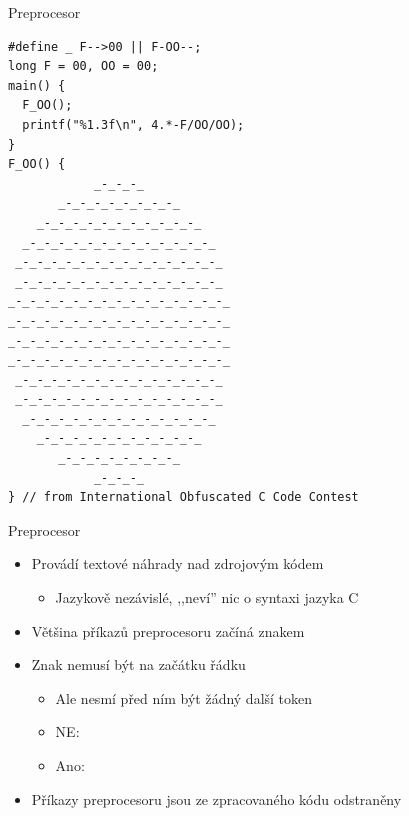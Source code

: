 \begin{frame}[fragile]{Preprocesor}

\begin{lstlisting}[columns=fixed,basicstyle=\scriptsize\ttfamily]
#define _ F-->00 || F-OO--;
long F = 00, OO = 00;
main() {
  F_OO();
  printf("%1.3f\n", 4.*-F/OO/OO);
}
F_OO() {
            _-_-_-_
       _-_-_-_-_-_-_-_-_
    _-_-_-_-_-_-_-_-_-_-_-_
  _-_-_-_-_-_-_-_-_-_-_-_-_-_
 _-_-_-_-_-_-_-_-_-_-_-_-_-_-_
 _-_-_-_-_-_-_-_-_-_-_-_-_-_-_
_-_-_-_-_-_-_-_-_-_-_-_-_-_-_-_
_-_-_-_-_-_-_-_-_-_-_-_-_-_-_-_
_-_-_-_-_-_-_-_-_-_-_-_-_-_-_-_
_-_-_-_-_-_-_-_-_-_-_-_-_-_-_-_
 _-_-_-_-_-_-_-_-_-_-_-_-_-_-_
 _-_-_-_-_-_-_-_-_-_-_-_-_-_-_
  _-_-_-_-_-_-_-_-_-_-_-_-_-_
    _-_-_-_-_-_-_-_-_-_-_-_
       _-_-_-_-_-_-_-_-_
            _-_-_-_
} // from International Obfuscated C Code Contest
\end{lstlisting} %

\end{frame}

\begin{frame}{Preprocesor}

  \begin{itemize}
    \item Provádí textové náhrady nad zdrojovým kódem
    \begin{itemize}
      \item Jazykově nezávislé, ,,neví'' nic o syntaxi jazyka C
    \end{itemize}

    \pause

    \item Většina příkazů preprocesoru začíná znakem \code{\#}

    \pause

    \item Znak \code{\#} nemusí být na začátku řádku
    \begin{itemize}
      \item Ale nesmí před ním být žádný další token

      \pause

      \item NE:  
      \item Ano: ~~~~~~~~
    \end{itemize}

    \pause

    \item Příkazy preprocesoru jsou ze zpracovaného kódu odstraněny
  \end{itemize}

\end{frame}

